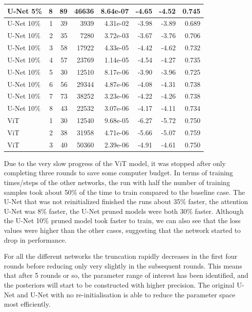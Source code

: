 \begin{table}[htb]
{\begin{tabular}{@{}lrrrrrrr@{}}
U-Net 5\% & 8 & 89 & 46636 & 8.64e-07 & -4.65 & -4.52 & 0.745 \\
\midrule
U-Net 10\% & 1 & 39 & 3939 & 4.31e-02 & -3.98 & -3.89 & 0.689 \\
U-Net 10\% & 2 & 35 & 7280 & 3.72e-03 & -3.67 & -3.76 & 0.706 \\
U-Net 10\% & 3 & 58 & 17922 & 4.33e-05 & -4.42 & -4.62 & 0.732 \\
U-Net 10\% & 4 & 57 & 23769 & 1.14e-05 & -4.54 & -4.27 & 0.735 \\
U-Net 10\% & 5 & 30 & 12510 & 8.17e-06 & -3.90 & -3.96 & 0.725 \\
U-Net 10\% & 6 & 56 & 29344 & 4.87e-06 & -4.08 & -4.31 & 0.738 \\
U-Net 10\% & 7 & 73 & 38252 & 3.23e-06 & -4.22 & -4.26 & 0.738 \\
U-Net 10\% & 8 & 43 & 22532 & 3.07e-06 & -4.17 & -4.11 & 0.734 \\
\midrule
ViT & 1 & 30 & 12540 & 9.68e-05 & -6.27 & -5.72 & 0.750 \\
ViT & 2 & 38 & 31958 & 4.71e-06 & -5.66 & -5.07 & 0.759 \\
ViT & 3 & 40 & 50360 & 2.39e-06 & -4.91 & -4.61 & 0.750 \\

\bottomrule
\end{tabular}}
\end{table}


Due to the very slow progress of the ViT model, it was stopped after only completing three rounds to save some computer budget. In terms of training times/steps of the other networks, the run with half the number of training samples took about 50\% of the time to train compared to the baseline case. The U-Net that was not reinitialized finished the runs about 35\% faster, the attention U-Net was 8\% faster, the U-Net pruned models were both 30\% faster. Although the U-Net 10\% pruned model took faster to train, we can also see that the loss values were higher than the other cases, suggesting that the network started to drop in performance.

For all the different networks the truncation rapidly decreases in the first four rounds before reducing only very slightly in the subsequent rounds. This means that after 5 rounds or so, the parameter range of interest has been identified, and the posteriors will start to be constructed with higher precision. The original U-Net and U-Net with no re-initialisation is able to reduce the parameter space most efficiently. 

